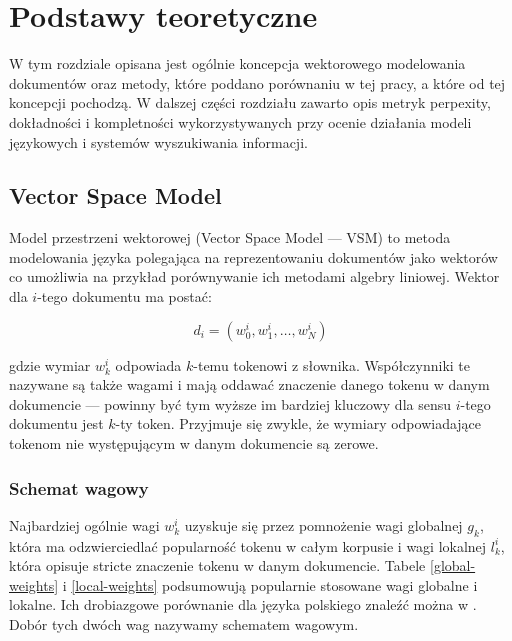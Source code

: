 \documentclass[11pt,a4paper]{article}
\begin{document}
\pagebreak


\section{Podstawy teoretyczne}
\label{sec:theory}

W tym rozdziale opisana jest ogólnie koncepcja wektorowego modelowania
dokumentów oraz metody, które poddano porównaniu w tej pracy, a które od tej
koncepcji pochodzą. W dalszej części rozdziału zawarto opis metryk perpexity,
dokładności i kompletności wykorzystywanych przy ocenie działania modeli
językowych i systemów wyszukiwania informacji.

\subsection{Vector Space Model}

Model przestrzeni wektorowej (Vector Space Model --- VSM) to metoda modelowania
języka polegająca na reprezentowaniu dokumentów jako wektorów co umożliwia na
przykład porównywanie ich metodami algebry liniowej.  Wektor dla $i$-tego
dokumentu ma postać:

\begin{equation}
d_i = (w^i_0, w^i_1, \ldots, w^i_N)
\end{equation}

gdzie wymiar $w^i_k$ odpowiada $k$-temu tokenowi z słownika. Współczynniki te
nazywane są także wagami i mają oddawać znaczenie danego tokenu w danym
dokumencie --- powinny być tym wyższe im bardziej kluczowy dla sensu $i$-tego
dokumentu jest $k$-ty token. Przyjmuje się zwykle, że wymiary odpowiadające
tokenom nie występującym w danym dokumencie są zerowe.

\subsubsection{Schemat wagowy}
\label{weighting-theory}
Najbardziej ogólnie wagi $w^i_k$ uzyskuje się przez pomnożenie wagi globalnej
$g_k$, która ma odzwierciedlać popularność tokenu w całym korpusie i wagi
lokalnej $l^i_k$, która opisuje stricte znaczenie tokenu w danym dokumencie.
Tabele \ref{global-weights} i \ref{local-weights} podsumowują popularnie
stosowane wagi globalne i lokalne. Ich drobiazgowe porównanie dla języka
polskiego znaleźć można w \cite{figiel}. Dobór tych dwóch wag nazywamy
schematem wagowym.
\end{document}
